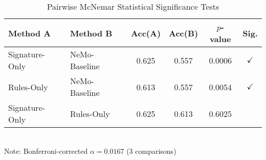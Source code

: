 \begin{table}[h]
\centering
\caption{Pairwise McNemar Statistical Significance Tests}
\label{tab:mcnemar}
\begin{tabular}{llcccc}
\toprule
Method A & Method B & Acc(A) & Acc(B) & $p$-value & Sig. \\
\midrule
Signature-Only & NeMo-Baseline & 0.625 & 0.557 & 0.0006 & $\checkmark$ \\
Rules-Only & NeMo-Baseline & 0.613 & 0.557 & 0.0054 & $\checkmark$ \\
Signature-Only & Rules-Only & 0.625 & 0.613 & 0.6025 &  \\
\bottomrule
\end{tabular}
\\[0.2cm]
{\small Note: Bonferroni-corrected $\alpha = 0.0167$ (3 comparisons)}
\end{table}